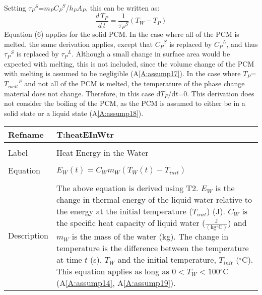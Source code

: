 \documentclass[12pt]{article}
\begin{document}
Setting ${{τ_{P}}^{S}}$=${m_{P}}$${{C_{P}}^{S}}$/${h_{P}}$${A_{P}}$, this can be written as:
\begin{dmath}
\frac{d\,{T_{P}}}{d\,t}=\frac{1}{{{τ_{P}}^{S}}} \left({T_{W}}-{T_{P}}\right)
\end{dmath}
Equation (6) applies for the solid PCM. In the case where all of the PCM is melted, the same derivation applies, except that ${{C_{P}}^{S}}$ is replaced by ${{C_{P}}^{L}}$, and thus ${{τ_{P}}^{S}}$ is replaced by ${{τ_{P}}^{L}}$. Although a small change in surface area would be expected with melting, this is not included, since the volume change of the PCM with melting is assumed to be negligible (A\ref{A:assump17}).
In the case where ${T_{P}}$=${{T_{melt}}^{P}}$ and not all of the PCM is melted, the temperature of the phase change material does not change. Therefore, in this case d${T_{P}}$/d$t$=0.
This derivation does not consider the boiling of the PCM, as the PCM is assumed to either be in a solid state or a liquid state (A\ref{A:assump18}).
~\newline
\noindent \begin{minipage}{\textwidth}
\begin{tabular}{p{} p{}}
\toprule \textbf{Refname} & \textbf{T:heatEInWtr}
\label{T:heatEInWtr}
\\ \midrule \\
Label & Heat Energy in the Water
\\ \midrule \\
Equation & ${E_{W}}\left(t\right)={C_{W}} {m_{W}} \left({T_{W}}\left(t\right)-{T_{init}}\right)$
\\ \midrule \\
Description & The above equation is derived using T2. ${E_{W}}$ is the change in thermal energy of the liquid water relative to the energy at the initial temperature (${T_{init}}$) (J). ${C_{W}}$ is the specific heat capacity of liquid water ($\frac{\text{J}}{(\text{kg}{}^{\circ}\text{C})}$) and ${m_{W}}$ is the mass of the water (kg). The change in temperature is the difference between the temperature at time $t$ (s), ${T_{W}}$ and the initial temperature, ${T_{init}}$ (${}^{\circ}$C). This equation applies as long as $0<{T_{W}}<100$${}^{\circ}$C (A\ref{A:assump14}, A\ref{A:assump19}).
\\ \bottomrule \end{tabular}
\end{minipage}\\
~\newline
\end{document}

